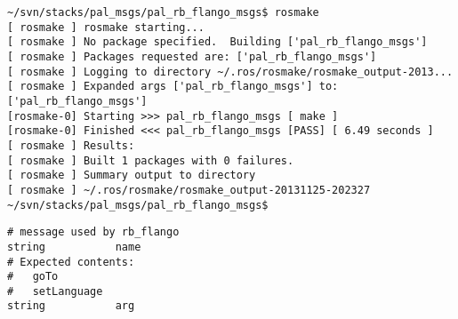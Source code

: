 \begin{lstlisting}[caption=Creation of a ROS Message, label=impl-ros-create-message]
~/svn/stacks/pal_msgs/pal_rb_flango_msgs$ rosmake
[ rosmake ] rosmake starting...                                                                                                                                                                                     
[ rosmake ] No package specified.  Building ['pal_rb_flango_msgs']                                                                                                                                                  
[ rosmake ] Packages requested are: ['pal_rb_flango_msgs']                                                                                                                                                          
[ rosmake ] Logging to directory ~/.ros/rosmake/rosmake_output-2013...
[ rosmake ] Expanded args ['pal_rb_flango_msgs'] to:
['pal_rb_flango_msgs']                                                                                                                                         
[rosmake-0] Starting >>> pal_rb_flango_msgs [ make ]                                                                                                                                                                
[rosmake-0] Finished <<< pal_rb_flango_msgs [PASS] [ 6.49 seconds ]                                                                                                                                                 
[ rosmake ] Results:                                                                                                                                                                                                
[ rosmake ] Built 1 packages with 0 failures.                                                                                                                                                                       
[ rosmake ] Summary output to directory                                                                                                                                                                             
[ rosmake ] ~/.ros/rosmake/rosmake_output-20131125-202327                                                                                                                                         
~/svn/stacks/pal_msgs/pal_rb_flango_msgs$ 
\end{lstlisting}

\begin{lstlisting}[caption=Message type from robotBehaviour to Flango CM (rbFlango.msg), label=impl-flango-ros-message]
# message used by rb_flango
string           name
# Expected contents:
#   goTo
#   setLanguage
string           arg

\end{lstlisting}

